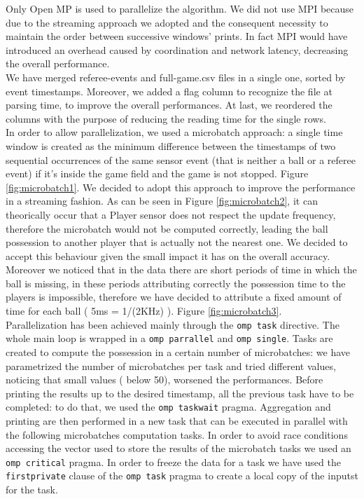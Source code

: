 \documentclass[a4paper]{article}
\begin{document}
Only Open MP is used to parallelize the algorithm. We did not use MPI because due to the streaming approach we adopted and the consequent necessity to maintain the order between successive windows' prints. In fact MPI would have introduced an overhead caused by coordination and network latency, decreasing the overall performance. \\
We have merged referee-events and full-game.csv files in a single one, sorted by event timestamps. Moreover, we added a flag column to recognize the file at parsing time, to improve the overall performances. At last, we reordered the columns with the purpose of reducing the reading time for the single rows. \\
In order to allow parallelization, we used a microbatch approach: a single time window is created as the minimum difference between the timestamps of two sequential occurrences of the same sensor event (that is neither a ball or a referee event) if it's inside the game field and the game is not stopped. Figure \ref{fig:microbatch1}. We decided to adopt this approach to improve the performance in a streaming fashion. As can be seen in Figure \ref{fig:microbatch2}, it can theorically occur that a Player sensor does not respect the update frequency, therefore the microbatch would not be computed correctly, leading the ball possession to another player that is actually not the nearest one. We decided to accept this behaviour given the small impact it has on the overall accuracy. Moreover we noticed that in the data there are short periods of time in which the ball is missing, in these periods attributing correctly the possession time to the players is impossible, therefore we have decided to attribute a fixed amount of time for each ball ( 5ms = 1/(2KHz) ). Figure \ref{fig:microbatch3}.\\

Parallelization has been achieved mainly through the \texttt{omp task} directive. The whole main loop is wrapped in a \texttt{omp parrallel} and \texttt{omp single}. Tasks are created to compute the possession in a certain number of microbatches: we have parametrized the number of microbatches per task and tried different values, noticing that small values ( below 50), worsened the performances. Before printing the results up to the desired timestamp, all the previous task have to be completed: to do that, we used the \texttt{omp taskwait} pragma. Aggregation and printing are then performed in a new task that can be executed in parallel with the following microbatches computation tasks. In order to avoid race conditions accessing the vector used to store the results of the microbatch tasks we used an \texttt{omp critical} pragma. In order to freeze the data for a task we have used the \texttt{firstprivate} clause of the \texttt{omp task} pragma to create a local copy of the inputst for the task.
\end{document}
